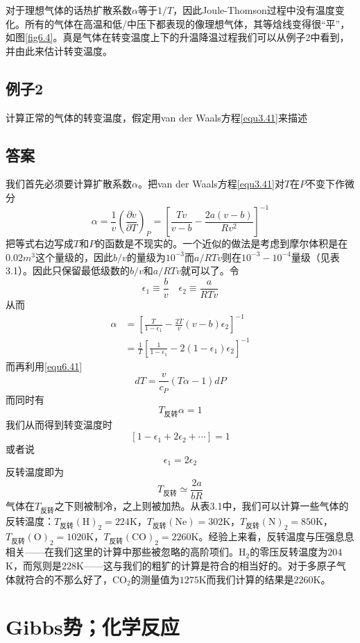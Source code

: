 对于理想气体的话热扩散系数$\alpha$等于$1/T$，因此Joule-Thomson过程中没有温度变化。所有的气体在高温和低/中压下都表现的像理想气体，其等焓线变得很“平”，如图\ref{fig6.4}。真是气体在转变温度上下的升温降温过程我们可以从例子2中看到，并由此来估计转变温度。

\subsection*{例子2}
计算正常的气体的转变温度，假定用van der Waals方程\eqref{equ3.41}来描述
\subsection*{答案}
我们首先必须要计算扩散系数$\alpha$。把van der Waals方程\eqref{equ3.41}对$T$在$P$不变下作微分
\[\alpha = \frac{1}{v}\left(\frac{\partial v}{\partial T}\right)_P=\left[\frac{Tv}{v-b}-\frac{2a(v-b)}{Rv^2}\right]^{-1} \]
把等式右边写成$T$和$P$的函数是不现实的。一个近似的做法是考虑到摩尔体积是在$0.02m^3$这个量级的，因此$b/v$的量级为$10^{-3}$而$a/RTv$则在$10^{-3}-10^{-4}$量级（见表3.1）。因此只保留最低级数的$b/v$和$a/RTv$就可以了。令
\[\epsilon_1\equiv\frac{b}{v}\quad \epsilon_2\equiv\frac{a}{RTv} \]
从而
\[\begin{split}
\alpha&=\left[\frac{T}{1-\epsilon_1}-\frac{2T}{v}(v-b)\epsilon_2\right]^{-1}\\
&=\frac{1}{T}\left[\frac{1}{1-\epsilon_1}-2(1-\epsilon_1)\epsilon_2\right]^{-1}
\end{split} \]
而再利用\eqref{equ6.41}
\[dT=\frac{v}{c_P}(T\alpha-1)dP \]
而同时有
\[T_{\text{反转}}\alpha=1 \]
我们从而得到转变温度时
\[[1-\epsilon_1+2\epsilon_2+\cdots]=1 \]
或者说
\[\epsilon_1=2\epsilon_2 \]
反转温度即为
\[T_{\text{反转}}\simeq\frac{2a}{bR} \]
气体在$T_{\text{反转}}$之下则被制冷，之上则被加热。从表3.1中，我们可以计算一些气体的反转温度：$T_{\text{反转}}(\mathrm{H})_2=224$K，$T_{\text{反转}}(\mathrm{Ne})=302$K，$T_{\text{反转}}(\mathrm{N})_2=850$K，$T_{\text{反转}}(\mathrm{O})_2=1020$K，$T_{\text{反转}}(\mathrm{CO})_2=2260$K。经验上来看，反转温度与压强息息相关——在我们这里的计算中那些被忽略的高阶项们。H$_2$的零压反转温度为$204$K，而氖则是$228$K——这与我们的粗犷的计算是符合的相当好的。对于多原子气体就符合的不那么好了，CO$_2$的测量值为$1275$K而我们计算的结果是$2260$K。



\section{Gibbs势；化学反应}
\label{sec6.4}

